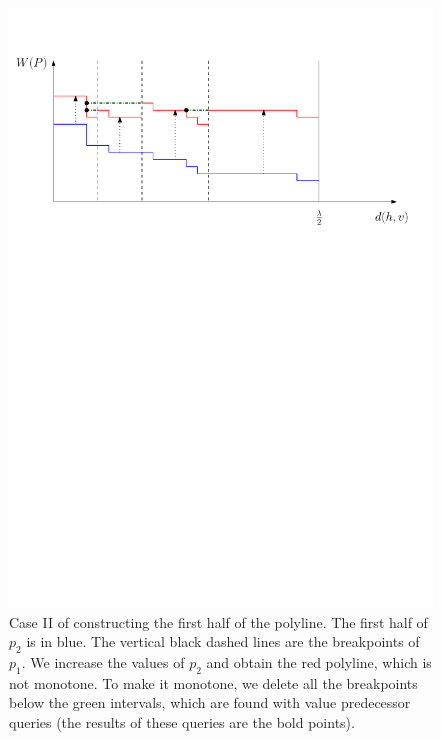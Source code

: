 \documentclass[a4paper,UKenglish]{lipics-v2016}
\theoremstyle{plain}
\begin{document}
\begin{figure}[h]
\begin{center}
\includegraphics[scale=0.6]{polyline_first_half_construction_case2}
\end{center}
\caption{Case II of constructing the first half of the polyline. The first half of $p_2$ is in blue. The vertical black dashed lines are the breakpoints of $p_1$. We increase the values of $p_{2}$ and obtain the red polyline, which is not monotone. To make it monotone, we delete all the breakpoints below the green intervals, which are found with value predecessor queries (the results of these queries are the bold points).\label{figure of the second case in the construction of the first half of the polyline}
}
\end{figure}
\end{document}
